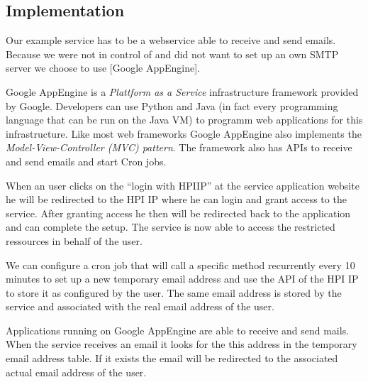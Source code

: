 \subsection{Implementation}

Our example service has to be a webservice able to receive and send
emails. Because we were not in control of and did not want to set
up an own SMTP server we choose to use [Google AppEngine].

Google AppEngine is a \emph{Plattform as a Service} infrastructure
framework provided by Google. Developers can use Python and Java
(in fact every programming language that can be run on the Java VM)
to programm web applications for this infrastructure. Like most web
frameworks Google AppEngine also implements the
\emph{Model-View-Controller (MVC) pattern}. The framework also has
APIs to receive and send emails and start Cron jobs.

When an user clicks on the ``login with HPIIP'' at the service
application website he will be redirected to the HPI IP where he
can login and grant access to the service. After granting access he
then will be redirected back to the application and can complete
the setup. The service is now able to access the restricted
ressources in behalf of the user.

We can configure a cron job that will call a specific method
recurrently every 10 minutes to set up a new temporary email
address and use the API of the HPI IP to store it as configured by
the user. The same email address is stored by the service and
associated with the real email address of the user.

Applications running on Google AppEngine are able to receive and
send mails. When the service receives an email it looks for the
this address in the temporary email address table. If it exists the
email will be redirected to the associated actual email address of
the user.
